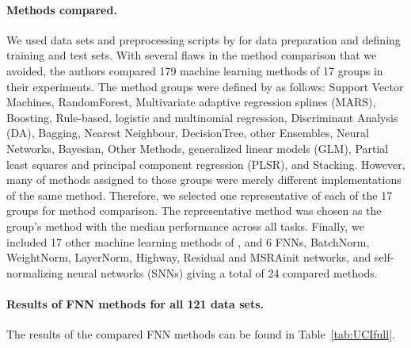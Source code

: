 \documentclass{article}
\begin{document}
\paragraph{Methods compared.} 
We used data sets and preprocessing scripts by \citet{bib:Fernandez2014} for data preparation and
defining training and test sets. With several flaws in the method comparison\citep{bib:Wainberg2016} that we avoided, 
the authors compared 179 machine learning methods of 17 groups in their experiments. 
The method groups were defined by \citet{bib:Fernandez2014} as follows:
Support Vector Machines, RandomForest, Multivariate adaptive regression splines (MARS), 
Boosting, Rule-based, logistic and multinomial regression,
Discriminant Analysis (DA), Bagging, 
Nearest Neighbour, DecisionTree, other Ensembles, Neural Networks, Bayesian, Other Methods,
generalized linear models (GLM), Partial least squares and principal component regression (PLSR), and Stacking.
However, many of methods assigned to those groups were merely different implementations of the 
same method. Therefore, we selected one representative of each of the 17 groups for method 
comparison. The representative method was chosen as the group's method with the median performance 
across all tasks. Finally, we included 17 other machine learning methods of \citet{bib:Fernandez2014},
and 6 FNNs, BatchNorm, WeightNorm, LayerNorm, 
Highway, Residual and MSRAinit networks, and self-normalizing neural networks (SNNs) giving a total of 24 compared methods. 

\paragraph{Results of FNN methods for all 121 data sets.}
The results of the compared FNN methods can be found in Table~\ref{tab:UCIfull}.
\end{document}
